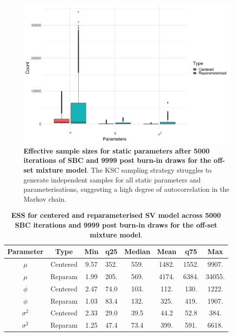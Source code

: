 \documentclass[12pt, a4paper]{article}
\begin{document}


    \begin{figure}[H]
        \centering
        \includegraphics[scale=0.1]{results/ksc_ess.png}
        \caption{\textbf{Effective sample sizes for static parameters after 5000 iterations of SBC and 9999 post burn-in draws for the off-set mixture model}. The KSC sampling strategy struggles to generate independent samples for all static parameters and parameterisations, suggesting a high degree of autocorrelation in the Markov chain.}
        \label{fig:kscess}
    \end{figure}

    \begin{table}[H]
        \centering
        \begin{tabular}{|c|c|c|c|c|c|c|c|} \hline 
        Parameter &  Type&Min& q25&  Median& Mean & q75&Max\\ \hline 
        $\mu$&  Centered&9.57 & 352. & 559. & 1482. & 1552. & 9907.\\
     $\mu$&  Reparam&1.99 & 205. & 569. & 4174. & 6384. & 34055.\\\hline 
     $\phi$&  Centered&2.47 & 74.0 & 103. & 112. & 130. & 1222.\\
     $\phi$&  Reparam&1.03 & 83.4 & 132. & 325. & 419. & 1907. \\ \hline 
     $\sigma^2$&  Centered&2.33 & 29.0 & 39.5 & 44.2 & 52.8 & 384. \\ 
     $\sigma^2$&  Reparam&1.25 & 47.4 & 73.4 & 399. & 591. & 6618. \\ \hline
        \end{tabular}
        \caption{\textbf{ESS for centered and reparameterised SV model across 5000 SBC iterations and 9999 post burn-in draws for the off-set mixture model}.}
        \label{tab:kscess}
    \end{table}
\end{document}
